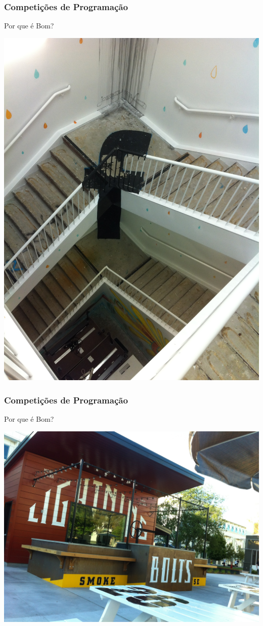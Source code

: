 \begin{frame}
\frametitle{Competições de Programação}
\begin{block}{Por que é Bom?}
\begin{center}
	\includegraphics[width=.7\textwidth]{sntc/IMG_2067.JPG}
\end{center}
\end{block}
\end{frame}
\begin{frame}
\frametitle{Competições de Programação}
\begin{block}{Por que é Bom?}
\begin{center}
	\includegraphics[width=.7\textwidth]{sntc/IMG_2074.JPG}
\end{center}
\end{block}
\end{frame}
